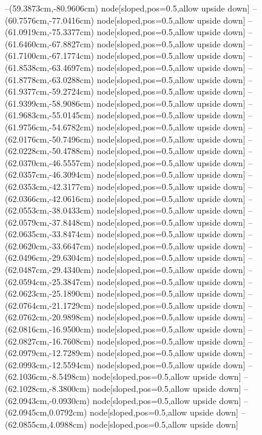 --(59.3873cm,-80.9606cm) node[sloped,pos=0.5,allow upside down]{\ArrowIn}
--(60.7576cm,-77.0416cm) node[sloped,pos=0.5,allow upside down]{\ArrowIn}
--(61.0919cm,-75.3377cm) node[sloped,pos=0.5,allow upside down]{\ArrowIn}
--(61.6460cm,-67.8827cm) node[sloped,pos=0.5,allow upside down]{\ArrowIn}
--(61.7100cm,-67.1774cm) node[sloped,pos=0.5,allow upside down]{\arrowIn}
--(61.8538cm,-63.4697cm) node[sloped,pos=0.5,allow upside down]{\ArrowIn}
--(61.8778cm,-63.0288cm) node[sloped,pos=0.5,allow upside down]{\arrowIn}
--(61.9377cm,-59.2724cm) node[sloped,pos=0.5,allow upside down]{\ArrowIn}
--(61.9399cm,-58.9086cm) node[sloped,pos=0.5,allow upside down]{\arrowIn}
--(61.9683cm,-55.0145cm) node[sloped,pos=0.5,allow upside down]{\ArrowIn}
--(61.9756cm,-54.6782cm) node[sloped,pos=0.5,allow upside down]{\arrowIn}
--(62.0176cm,-50.7496cm) node[sloped,pos=0.5,allow upside down]{\ArrowIn}
--(62.0228cm,-50.4788cm) node[sloped,pos=0.5,allow upside down]{\arrowIn}
--(62.0370cm,-46.5557cm) node[sloped,pos=0.5,allow upside down]{\ArrowIn}
--(62.0357cm,-46.3094cm) node[sloped,pos=0.5,allow upside down]{\arrowIn}
--(62.0353cm,-42.3177cm) node[sloped,pos=0.5,allow upside down]{\ArrowIn}
--(62.0366cm,-42.0616cm) node[sloped,pos=0.5,allow upside down]{\arrowIn}
--(62.0553cm,-38.0433cm) node[sloped,pos=0.5,allow upside down]{\ArrowIn}
--(62.0579cm,-37.8448cm) node[sloped,pos=0.5,allow upside down]{\arrowIn}
--(62.0635cm,-33.8474cm) node[sloped,pos=0.5,allow upside down]{\ArrowIn}
--(62.0620cm,-33.6647cm) node[sloped,pos=0.5,allow upside down]{\arrowIn}
--(62.0496cm,-29.6304cm) node[sloped,pos=0.5,allow upside down]{\ArrowIn}
--(62.0487cm,-29.4340cm) node[sloped,pos=0.5,allow upside down]{\arrowIn}
--(62.0594cm,-25.3847cm) node[sloped,pos=0.5,allow upside down]{\ArrowIn}
--(62.0623cm,-25.1890cm) node[sloped,pos=0.5,allow upside down]{\arrowIn}
--(62.0764cm,-21.1729cm) node[sloped,pos=0.5,allow upside down]{\ArrowIn}
--(62.0762cm,-20.9898cm) node[sloped,pos=0.5,allow upside down]{\arrowIn}
--(62.0816cm,-16.9500cm) node[sloped,pos=0.5,allow upside down]{\ArrowIn}
--(62.0827cm,-16.7608cm) node[sloped,pos=0.5,allow upside down]{\arrowIn}
--(62.0979cm,-12.7289cm) node[sloped,pos=0.5,allow upside down]{\ArrowIn}
--(62.0993cm,-12.5594cm) node[sloped,pos=0.5,allow upside down]{\arrowIn}
--(62.1036cm,-8.5498cm) node[sloped,pos=0.5,allow upside down]{\ArrowIn}
--(62.1028cm,-8.3800cm) node[sloped,pos=0.5,allow upside down]{\arrowIn}
--(62.0943cm,-0.0930cm) node[sloped,pos=0.5,allow upside down]{\ArrowIn}
--(62.0945cm,0.0792cm) node[sloped,pos=0.5,allow upside down]{\arrowIn}
--(62.0855cm,4.0988cm) node[sloped,pos=0.5,allow upside down]{\ArrowIn}
